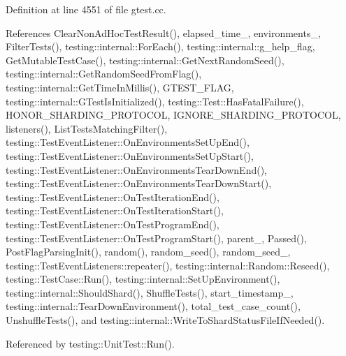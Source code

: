 Definition at line 4551 of file gtest.\+cc.



References Clear\+Non\+Ad\+Hoc\+Test\+Result(), elapsed\+\_\+time\+\_\+, environments\+\_\+, Filter\+Tests(), testing\+::internal\+::\+For\+Each(), testing\+::internal\+::g\+\_\+help\+\_\+flag, Get\+Mutable\+Test\+Case(), testing\+::internal\+::\+Get\+Next\+Random\+Seed(), testing\+::internal\+::\+Get\+Random\+Seed\+From\+Flag(), testing\+::internal\+::\+Get\+Time\+In\+Millis(), G\+T\+E\+S\+T\+\_\+\+F\+L\+AG, testing\+::internal\+::\+G\+Test\+Is\+Initialized(), testing\+::\+Test\+::\+Has\+Fatal\+Failure(), H\+O\+N\+O\+R\+\_\+\+S\+H\+A\+R\+D\+I\+N\+G\+\_\+\+P\+R\+O\+T\+O\+C\+OL, I\+G\+N\+O\+R\+E\+\_\+\+S\+H\+A\+R\+D\+I\+N\+G\+\_\+\+P\+R\+O\+T\+O\+C\+OL, listeners(), List\+Tests\+Matching\+Filter(), testing\+::\+Test\+Event\+Listener\+::\+On\+Environments\+Set\+Up\+End(), testing\+::\+Test\+Event\+Listener\+::\+On\+Environments\+Set\+Up\+Start(), testing\+::\+Test\+Event\+Listener\+::\+On\+Environments\+Tear\+Down\+End(), testing\+::\+Test\+Event\+Listener\+::\+On\+Environments\+Tear\+Down\+Start(), testing\+::\+Test\+Event\+Listener\+::\+On\+Test\+Iteration\+End(), testing\+::\+Test\+Event\+Listener\+::\+On\+Test\+Iteration\+Start(), testing\+::\+Test\+Event\+Listener\+::\+On\+Test\+Program\+End(), testing\+::\+Test\+Event\+Listener\+::\+On\+Test\+Program\+Start(), parent\+\_\+, Passed(), Post\+Flag\+Parsing\+Init(), random(), random\+\_\+seed(), random\+\_\+seed\+\_\+, testing\+::\+Test\+Event\+Listeners\+::repeater(), testing\+::internal\+::\+Random\+::\+Reseed(), testing\+::\+Test\+Case\+::\+Run(), testing\+::internal\+::\+Set\+Up\+Environment(), testing\+::internal\+::\+Should\+Shard(), Shuffle\+Tests(), start\+\_\+timestamp\+\_\+, testing\+::internal\+::\+Tear\+Down\+Environment(), total\+\_\+test\+\_\+case\+\_\+count(), Unshuffle\+Tests(), and testing\+::internal\+::\+Write\+To\+Shard\+Status\+File\+If\+Needed().



Referenced by testing\+::\+Unit\+Test\+::\+Run().


